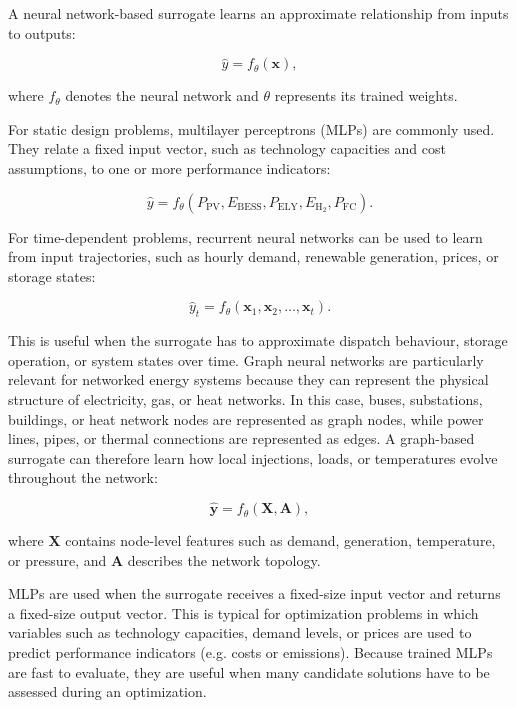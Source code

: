 A neural network-based surrogate learns an approximate relationship from
inputs to outputs:

$$\begin{equation}
 \hat{y} = f_{\theta}(\mathbf{x}),
\end{equation}$$

where $f_{\theta}$ denotes the neural network and $\theta$ represents
its trained weights.

For static design problems, multilayer perceptrons (MLPs) are commonly
used. They relate a fixed input vector, such as technology capacities
and cost assumptions, to one or more performance indicators:

$$\begin{equation}
 \hat{y} = f_{\theta} \left( P_{\mathrm{PV}}, E_{\mathrm{BESS}}, P_{\mathrm{ELY}}, E_{\mathrm{H_2}}, P_{\mathrm{FC}} \right).
\end{equation}$$

For time-dependent problems, recurrent neural networks can be used to
learn from input trajectories, such as hourly demand, renewable
generation, prices, or storage states:

$$\begin{equation}
 \hat{y}_t = f_{\theta} \left( \mathbf{x}_1,\mathbf{x}_2,\ldots,\mathbf{x}_t \right).
\end{equation}$$

This is useful when the surrogate has to approximate dispatch behaviour,
storage operation, or system states over time. Graph neural networks are
particularly relevant for networked energy systems because they can
represent the physical structure of electricity, gas, or heat networks.
In this case, buses, substations, buildings, or heat network nodes are
represented as graph nodes, while power lines, pipes, or thermal
connections are represented as edges. A graph-based surrogate can
therefore learn how local injections, loads, or temperatures evolve
throughout the network:

$$\begin{equation}
 \hat{\mathbf{y}} = f_{\theta} \left( \mathbf{X}, \mathbf{A} \right),
\end{equation}$$

where $\mathbf{X}$ contains node-level features such as demand,
generation, temperature, or pressure, and $\mathbf{A}$ describes the
network topology.

MLPs are used when the surrogate receives a fixed-size input vector and
returns a fixed-size output vector. This is typical for optimization
problems in which variables such as technology capacities, demand
levels, or prices are used to predict performance indicators (e.g. costs
or emissions). Because trained MLPs are fast to evaluate, they are
useful when many candidate solutions have to be assessed during an
optimization.

